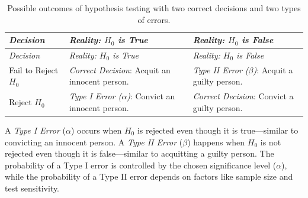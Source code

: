 \documentclass[
]{book}
\theoremstyle{definition}
\theoremstyle{definition}
\theoremstyle{definition}
\theoremstyle{definition}
\theoremstyle{remark}
\begin{document}
\begin{longtable}[]{@{}
  >{\raggedright\arraybackslash}p{}
  >{\raggedright\arraybackslash}p{}
  >{\raggedright\arraybackslash}p{}@{}}
\caption{\label{tab:hypothesis-errors} Possible outcomes of hypothesis testing with two correct decisions and two types of errors.}\tabularnewline
\toprule\noalign{}
\begin{minipage}[b]{\linewidth}\raggedright
\emph{Decision}
\end{minipage} & \begin{minipage}[b]{\linewidth}\raggedright
\emph{Reality: \(H_0\) is True}
\end{minipage} & \begin{minipage}[b]{\linewidth}\raggedright
\emph{Reality: \(H_0\) is False}
\end{minipage} \\
\midrule\noalign{}
\endfirsthead
\toprule\noalign{}
\begin{minipage}[b]{\linewidth}\raggedright
\emph{Decision}
\end{minipage} & \begin{minipage}[b]{\linewidth}\raggedright
\emph{Reality: \(H_0\) is True}
\end{minipage} & \begin{minipage}[b]{\linewidth}\raggedright
\emph{Reality: \(H_0\) is False}
\end{minipage} \\
\midrule\noalign{}
\endhead
\bottomrule\noalign{}
\endlastfoot
Fail to Reject \(H_0\) & {\emph{Correct Decision}: Acquit an innocent person.} & {\emph{Type II Error (\(\beta\))}: Acquit a guilty person.} \\
Reject \(H_0\) & {\emph{Type I Error (\(\alpha\))}: Convict an innocent person.} & {\emph{Correct Decision}: Convict a guilty person.} \\
\end{longtable}

A \emph{Type I Error} (\(\alpha\)) occurs when \(H_0\) is rejected even though it is true---similar to convicting an innocent person. A \emph{Type II Error} (\(\beta\)) happens when \(H_0\) is not rejected even though it is false---similar to acquitting a guilty person. The probability of a Type I error is controlled by the chosen significance level (\(\alpha\)), while the probability of a Type II error depends on factors like sample size and test sensitivity.
\end{document}
